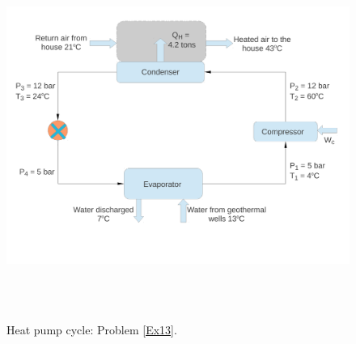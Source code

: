 \documentclass[12pts,a4paper,amsmath,amssymb,floatfix]{article}%
\begin{document}
\begin{enumerate}[label=\bfseries Problem \arabic*]
\begin{figure}[h]
\begin{center}
\includegraphics[width=16.0cm,height=12.0cm]{./Pics/Overview_Refrig42}
\end{center}
\caption{Heat pump cycle: Problem \ref{Ex13}.}\label{Ex13:Fig}
\end{figure}
 
\end{enumerate}
\end{document}
